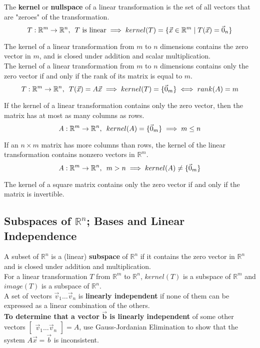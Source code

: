 \documentclass[]{scrartcl}
\begin{document}
	The \textbf{kernel} or \textbf{nullspace} of a linear transformation is the set of all vectors that are "zeroes" of the transformation.
	$$
	T: \mathbb{R}^m \rightarrow \mathbb{R}^n, \enskip T \text{ is linear} \implies kernel(T) = \{ \vec{x} \in \mathbb{R}^m \mid T(\vec{x}) = \vec{0}_n \}
	$$
	
	The kernel of a linear transformation from $m$ to $n$ dimensions contains the zero vector in $m$, and is closed under addition and scalar multiplication.\\
	
	The kernel of a linear transformation from $m$ to $n$ dimensions contains only the zero vector if and only if the rank of its matrix is equal to $m$.
	$$
	T: \mathbb{R}^m \rightarrow \mathbb{R}^n,  \enskip T(\vec{x}) = A\vec{x} \implies kernel(T) = \{\vec{0}_m\} \iff rank(A) = m
	$$
	
	If the kernel of a linear transformation contains only the zero vector, then the matrix has at most as many columns as rows.
	$$
	A: \mathbb{R}^m \rightarrow \mathbb{R}^n, \enskip kernel(A) = \{\vec{0}_m\} \implies m \leq n
	$$
	
	If an $n \times m$ matrix has more columns than rows, the kernel of the linear transformation contains nonzero vectors in $\mathbb{R}^m$.
	$$
	A: \mathbb{R}^m \rightarrow \mathbb{R}^n, \enskip m > n \implies kernel(A) \neq \{\vec{0}_m\}
	$$
	
	The kernel of a square matrix contains only the zero vector if and only if the matrix is invertible.
	
	\subsection{Subspaces of $\mathbb{R}^n$; Bases and Linear Independence}
	A subset of $\mathbb{R}^n$ is a (linear) \textbf{subspace} of $\mathbb{R}^n$ if it contains the zero vector in $\mathbb{R}^n$ and is closed under addition and multiplication.\\
	
	For a linear transformation $T$ from $\mathbb{R}^m$ to $\mathbb{R}^n$, $kernel(T)$ is a subspace of $\mathbb{R}^m$ and $image(T)$ is a subspace of $\mathbb{R}^n$.\\
	
	A set of vectors $\vec{v}_1 \ldots \vec{v}_n$ is \textbf{linearly independent} if none of them can be expressed as a linear combination of the others.\\
	
	\textbf{To determine that a vector $\boldsymbol{\vec{b}}$ is linearly independent} of some other vectors $\begin{bmatrix}\vec{v}_1 \ldots \vec{v}_n\end{bmatrix} = A$, use Gauss-Jordanian Elimination to show that the system $A\vec{x}=\vec{b}$ is inconsistent.\\
	
\end{document}
